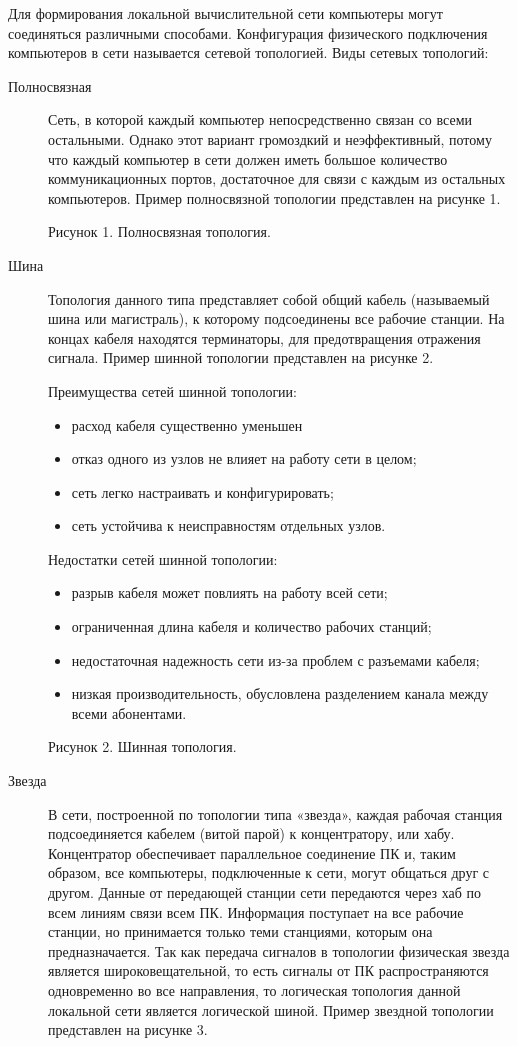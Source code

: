 Для формирования локальной вычислительной сети компьютеры могут соединяться различными способами. Конфигурация физического подключения компьютеров в сети называется сетевой топологией.
Виды сетевых топологий:
\begin{description}
\item[Полносвязная]
  Сеть, в которой каждый компьютер непосредственно связан со всеми остальными. Однако этот вариант громоздкий и неэффективный, потому что каждый компьютер в сети должен иметь большое количество коммуникационных портов, достаточное для связи с каждым из остальных компьютеров. Пример полносвязной топологии представлен на рисунке 1.


Рисунок 1. Полносвязная топология.

\item[Шина]
  Топология данного типа представляет собой общий кабель (называемый шина или магистраль), к которому подсоединены все рабочие станции. На концах кабеля находятся терминаторы, для предотвращения отражения сигнала. Пример шинной топологии представлен на рисунке 2.

Преимущества сетей шинной топологии:
\begin{itemize}
\item расход кабеля существенно уменьшен
\item отказ одного из узлов не влияет на работу сети в целом;
\item сеть легко настраивать и конфигурировать;
\item сеть устойчива к неисправностям отдельных узлов.
\end{itemize}
Недостатки сетей шинной топологии:
\begin{itemize}
\item разрыв кабеля может повлиять на работу всей сети;
\item ограниченная длина кабеля и количество рабочих станций;
\item недостаточная надежность сети из-за проблем с разъемами кабеля;
\item низкая производительность, обусловлена разделением канала между    всеми абонентами.
\end{itemize}


Рисунок 2. Шинная топология.

\item[Звезда]
  В сети, построенной по топологии типа «звезда», каждая рабочая станция подсоединяется кабелем (витой парой) к концентратору, или хабу. Концентратор обеспечивает параллельное соединение ПК и, таким образом, все компьютеры, подключенные к сети, могут общаться друг с другом.
Данные от передающей станции сети передаются через хаб по всем линиям связи всем ПК. Информация поступает на все рабочие станции, но принимается только теми станциями, которым она предназначается. Так как передача сигналов в топологии физическая звезда является широковещательной, то есть сигналы от ПК распространяются одновременно во все направления, то логическая топология данной локальной сети является логической шиной. Пример звездной топологии представлен на рисунке 3.



\end{description}
